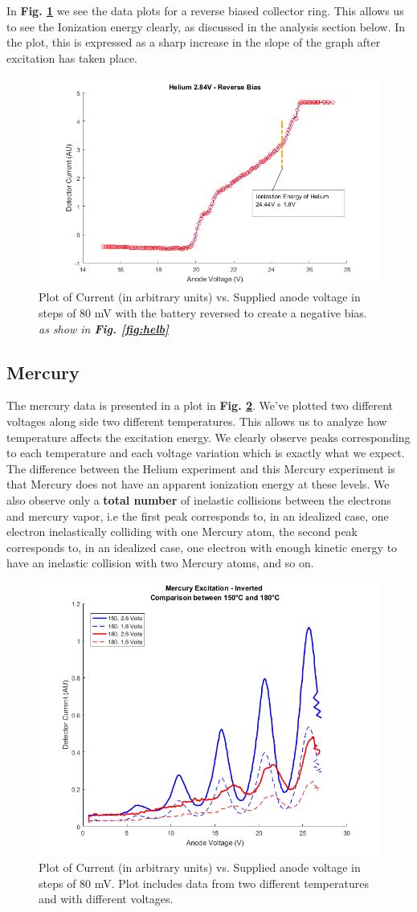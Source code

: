 \documentclass[%
 reprint,
 amsmath,amssymb,
 aps,
]{revtex4-1}
\begin{document}
In \textbf{Fig. \ref{fig:heltworev}} we see the data plots for a reverse biased collector ring. This allows us to see the Ionization energy clearly, as discussed in the analysis section below. In the plot, this is expressed as a sharp increase in the slope of the graph after excitation has taken place.
\begin{figure}[!ht]\centering
\includegraphics[width = .5\textwidth,keepaspectratio]{fig2.png}
\caption{Plot of Current (in arbitrary units) vs. Supplied anode voltage in steps of 80 mV with the battery reversed to create a negative bias. \textit{as show in \textbf{Fig. \ref{fig:helb}}}}
\label{fig:heltworev}
\end{figure}

\subsection{\label{sec:merd}Mercury}
The mercury data is presented in a plot in \textbf{Fig. \ref{fig:merd}}. We've plotted two different voltages along side two different temperatures. This allows us to analyze how temperature affects the excitation energy. We clearly observe peaks corresponding to each temperature and each voltage variation which is exactly what we expect. The difference between the Helium experiment and this Mercury experiment is that Mercury does not have an apparent ionization energy at these levels. We also observe only a \textbf{total number} of inelastic collisions between the electrons and mercury vapor, i.e the first peak corresponds to, in an idealized case, one electron inelastically colliding with one Mercury atom, the second peak corresponds to, in an idealized case, one electron with enough kinetic energy to have an inelastic collision with two Mercury atoms, and so on.  
\begin{figure}[!ht]\centering
\includegraphics[width = .5\textwidth,keepaspectratio]{22.png}
\caption{Plot of Current (in arbitrary units) vs. Supplied anode voltage in steps of 80 mV. Plot includes data from two different temperatures and with different voltages.}
\label{fig:merd}
\end{figure}
\end{document}
